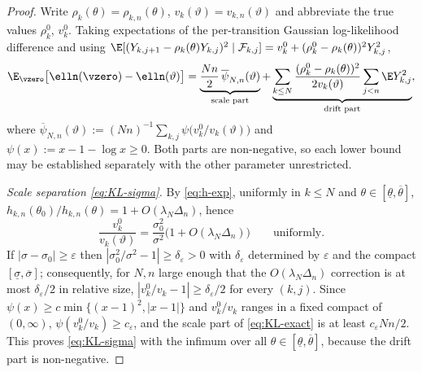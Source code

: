 \closuredraft
\begin{proof}
Write $\rho_k(\theta)=\rho_{k,n}(\theta)$, $v_k(\vartheta)=v_{k,n}(\vartheta)$
and abbreviate the true values $\rho_k^0$, $v_k^0$. Taking expectations of the
per-transition Gaussian log-likelihood difference and using
$\E[(Y_{k,j+1}-\rho_k(\theta)Y_{k,j})^2\mid\mathcal F_{k,j}]
=v_k^0+(\rho_k^0-\rho_k(\theta))^2Y_{k,j}^2$,
\begin{equation}\label{eq:KL-exact}
 \E_{\vzero}\big[\elln(\vzero)-\elln(\vartheta)\big]
 =\underbrace{\frac{Nn}{2}\,\overline{\psi}_{N,n}(\vartheta)}_{\text{scale part}}
 +\underbrace{\sum_{k\le N}\frac{(\rho_k^0-\rho_k(\theta))^2}
 {2v_k(\vartheta)}\sum_{j<n}\E Y_{k,j}^2}_{\text{drift part}},
\end{equation}
where
$\overline{\psi}_{N,n}(\vartheta)
:=(Nn)^{-1}\sum_{k,j}\psi\big(v_k^0/v_k(\vartheta)\big)$ and
$\psi(x):=x-1-\log x\ge0$. Both parts are non-negative, so each lower bound
may be established separately with the other parameter unrestricted.

\emph{Scale separation \eqref{eq:KL-sigma}.}
By \eqref{eq:h-exp}, uniformly in $k\le N$ and
$\theta\in[\underline\theta,\overline\theta]$,
$h_{k,n}(\theta_0)/h_{k,n}(\theta)=1+O(\lambda_N\Delta_n)$, hence
\[
 \frac{v_k^0}{v_k(\vartheta)}
 =\frac{\sigma_0^2}{\sigma^2}\big(1+O(\lambda_N\Delta_n)\big)
 \qquad\text{uniformly.}
\]
If $|\sigma-\sigma_0|\ge\varepsilon$ then
$|\sigma_0^2/\sigma^2-1|\ge\delta_\varepsilon>0$ with
$\delta_\varepsilon$ determined by $\varepsilon$ and the compact
$[\underline\sigma,\overline\sigma]$; consequently, for $N,n$ large enough
that the $O(\lambda_N\Delta_n)$ correction is at most $\delta_\varepsilon/2$
in relative size, $|v_k^0/v_k-1|\ge\delta_\varepsilon/2$ for every $(k,j)$.
Since $\psi(x)\ge c\min\{(x-1)^2,|x-1|\}$ and $v_k^0/v_k$ ranges in a fixed
compact of $(0,\infty)$, $\psi(v_k^0/v_k)\ge c_\varepsilon$, and the scale
part of \eqref{eq:KL-exact} is at least $c_\varepsilon Nn/2$. This proves
\eqref{eq:KL-sigma} with the infimum over all
$\theta\in[\underline\theta,\overline\theta]$, because the drift part is
non-negative.


\end{proof}
